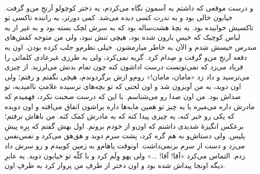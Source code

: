 \documentclass[12pt]{book}
\begin{document}
    \paragraph{}
    و درست موقعی که داشتم به آسمون نگاه می‌کردم، یه دختر کوچولو آرنجِ من‌و گرفت. خیابون خالی بود و به ندرت کسی دیده می‌شد. کمی دورتر، یه راننده تاکسی تو تاکسیش خوابیده بود. یه بچهٔ هشت‌ساله بود که به سرش لچک بسته بود و به غیر از یه لباس کوچیک که خیسِ بارون شده بود، هیچی تنش نبود، ولی من متوجه کفش‌های مندرس خیسش شدم و الآن به خاطر میارمشون. خیلی نظرم‌و جلب کرده بودن. اون یه دفعه آرنجِ من‌و گرفت و صِدام کرد. گریه نمی‌کرد، ولی به طرزی غیرعادی کلماتی را فریاد می‌زد که نمی‌تونست درست اداشون کنه چون تمام بدنش می‌لرزید. از چیزی می‌ترسید و داد زد «مامان، مامان!» روم‌و ازش برگردوندم، هیچی نگفتم و رفتم؛ ولی اون دوید، به من آویزون شد و اون لحنی که تو بچه‌های ترسیده علامتِ ناامیدیه، تو صداش بود. من اون صدا رو می‌شناسم. با این که درست صحبت نکرد، فهمیدم که مادرش داره می‌میره یا یه چیز تو همین مایه‌ها داره براشون اتفاق می‌افته و اون دویده که یکی رو خبر کنه، یه چیزی پیدا کنه که به مادرش کمک کنه. من باهاش نرفتم؛ برعکس انگیزهٔ شدیدی داشتم که اون‌و از خودم برونم. اول بهش گفتم که بِرِه پیشِ پلیس. ولی دستاش‌و به هم گره کرد، پشت سرم دوید و هق‌هق می‌کرد و نفس‌نفس می‌زد و دست از سرم برنمی‌داشت. اونوقت پاهام‌و به زمین کوبیدم و رو سرش داد زدم. التماس می‌کرد «آقا! آقا! ...» ولی یهو وِلَم کرد و با کلّه تو خیابون دوید. یه عابرِ دیگه اونجا پیداش شده بود و اون دختر از طرفِ من پرواز کرد به طرفِ اون.
\end{document}
